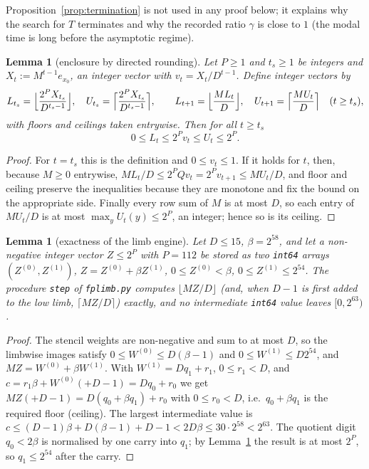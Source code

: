 \documentclass[11pt,a4paper]{article}
\newtheorem{lemma}[theorem]{Lemma}
\theoremstyle{definition}
\theoremstyle{remark}
\begin{document}
Proposition~\ref{prop:termination} is not used in any proof below; it explains why the search for $T$ terminates and why the recorded ratio $\gamma$ is close to $1$ (the modal time is long before the asymptotic regime).

\begin{lemma}[enclosure by directed rounding]\label{lem:encl}
Let $P\ge1$ and $t_s\ge1$ be integers and $X_t:=M^{t-1}e_{x_0}$, an integer vector with $v_t=X_t/D^{t-1}$. Define integer vectors by
\[
L_{t_s}=\Bigl\lfloor \frac{2^PX_{t_s}}{D^{t_s-1}}\Bigr\rfloor,\quad U_{t_s}=\Bigl\lceil \frac{2^PX_{t_s}}{D^{t_s-1}}\Bigr\rceil,\qquad
L_{t+1}=\Bigl\lfloor\frac{ML_t}{D}\Bigr\rfloor,\quad U_{t+1}=\Bigl\lceil\frac{MU_t}{D}\Bigr\rceil\quad(t\ge t_s),
\]
with floors and ceilings taken entrywise. Then for all $t\ge t_s$
\[
0\le L_t\le 2^Pv_t\le U_t\le 2^P .
\]
\end{lemma}
\begin{proof}
For $t=t_s$ this is the definition and $0\le v_t\le1$. If it holds for $t$, then, because $M\ge0$ entrywise, $ML_t/D\le 2^PQv_t=2^Pv_{t+1}\le MU_t/D$, and floor and ceiling preserve the inequalities because they are monotone and fix the bound on the appropriate side. Finally every row sum of $M$ is at most $D$, so each entry of $MU_t/D$ is at most $\max_yU_t(y)\le2^P$, an integer; hence so is its ceiling.
\end{proof}

\begin{lemma}[exactness of the limb engine]\label{lem:limb}
Let $D\le15$, $\beta=2^{58}$, and let a non-negative integer vector $Z\le 2^P$ with $P=112$ be stored as two \texttt{int64} arrays $(Z^{(0)},Z^{(1)})$, $Z=Z^{(0)}+\beta Z^{(1)}$, $0\le Z^{(0)}<\beta$, $0\le Z^{(1)}\le2^{54}$. The procedure \texttt{step} of \texttt{fplimb.py} computes $\lfloor MZ/D\rfloor$ (and, when $D-1$ is first added to the low limb, $\lceil MZ/D\rceil$) exactly, and no intermediate \texttt{int64} value leaves $[0,2^{63})$.
\end{lemma}
\begin{proof}
The stencil weights are non-negative and sum to at most $D$, so the limbwise images satisfy $0\le W^{(0)}\le D(\beta-1)$ and $0\le W^{(1)}\le D2^{54}$, and $MZ=W^{(0)}+\beta W^{(1)}$. With $W^{(1)}=Dq_1+r_1$, $0\le r_1<D$, and $c=r_1\beta+W^{(0)}(+D-1)=Dq_0+r_0$ we get $MZ(+D-1)=D(q_0+\beta q_1)+r_0$ with $0\le r_0<D$, i.e.\ $q_0+\beta q_1$ is the required floor (ceiling). The largest intermediate value is $c\le(D-1)\beta+D(\beta-1)+D-1<2D\beta\le30\cdot2^{58}<2^{63}$. The quotient digit $q_0<2\beta$ is normalised by one carry into $q_1$; by Lemma~\ref{lem:encl} the result is at most $2^P$, so $q_1\le2^{54}$ after the carry.
\end{proof}
\end{document}
